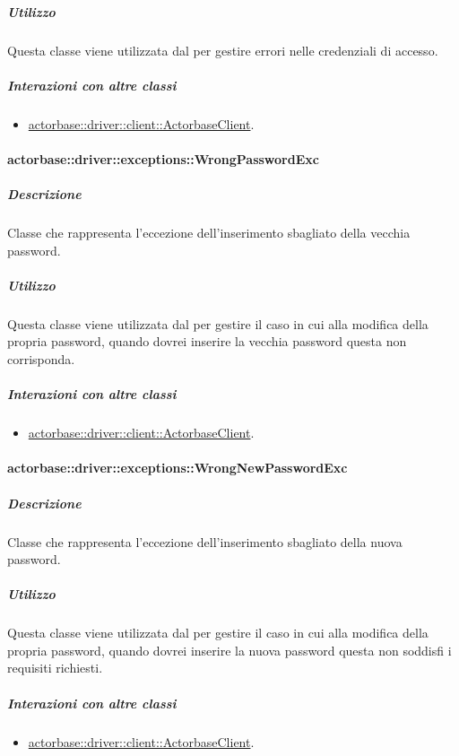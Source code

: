 \documentclass{scalatekids-article}
\begin{document}
\subparagraph{Utilizzo}

Questa classe viene utilizzata dal  per gestire errori nelle credenziali di accesso.

\subparagraph{Interazioni con altre classi}

\begin{itemize}
\item \hyperref[sec:actorbase::driver::client::ActorbaseClient]{actorbase::driver::client::ActorbaseClient}.
\end{itemize}

\paragraph{actorbase::driver::exceptions::WrongPasswordExc}

\subparagraph{Descrizione}

Classe che rappresenta l'eccezione dell'inserimento sbagliato della vecchia password.

\subparagraph{Utilizzo}

Questa classe viene utilizzata dal  per gestire il caso in cui alla modifica della propria password, quando dovrei inserire la vecchia password questa non corrisponda.

\subparagraph{Interazioni con altre classi}

\begin{itemize}
\item \hyperref[sec:actorbase::driver::client::ActorbaseClient]{actorbase::driver::client::ActorbaseClient}.
\end{itemize}

\paragraph{actorbase::driver::exceptions::WrongNewPasswordExc}

\subparagraph{Descrizione}

Classe che rappresenta l'eccezione dell'inserimento sbagliato della nuova password.

\subparagraph{Utilizzo}

Questa classe viene utilizzata dal  per gestire il caso in cui alla modifica della propria password, quando dovrei inserire la nuova password questa non soddisfi i requisiti richiesti.

\subparagraph{Interazioni con altre classi}

\begin{itemize}
\item \hyperref[sec:actorbase::driver::client::ActorbaseClient]{actorbase::driver::client::ActorbaseClient}.
\end{itemize}
\end{document}
